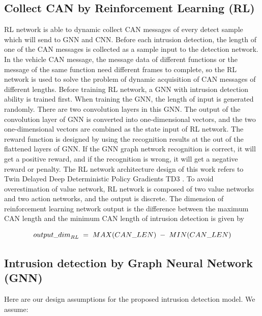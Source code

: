 \documentclass[lettersize,journal]{IEEEtran}
\begin{document}
\subsection{Collect CAN by Reinforcement Learning (RL)}\label{RL}
RL network is able to dynamic collect CAN messages of every detect sample which will send to GNN and CNN. Before each intrusion detection, the length of one of the CAN messages is collected as a sample input to the detection network. In the vehicle CAN message, the message data of different functions or the message of the same function need different frames to complete, so the RL network is used to solve the problem of dynamic acquisition of CAN messages of different lengths. Before training RL network, a GNN with intrusion detection ability is trained first. When training the GNN, the length of input is generated randomly. There are two convolution layers in this GNN. The output of the convolution layer of GNN is converted into one-dimensional vectors, and the two one-dimensional vectors are combined as the state input of RL network. The reward function is designed by using the recognition results at the out of the flattened layers of GNN. If the GNN graph network recognition is correct, it will get a positive reward, and if the recognition is wrong, it will get a negative reward or penalty. The RL network architecture design of this work refers to Twin Delayed Deep Deterministic Policy Gradients TD3 \cite{43}. To avoid overestimation of value network, RL network is composed of two value networks and two action networks, and the output is discrete. The dimension of reinforcement learning network output is the difference between the maximum CAN length and the minimum CAN length of intrusion detection is given by

\begin{equation}
\label{deqn_ex_1}
\footnotesize {{output\_dim}_{RL}\ =\ MAX(CAN\_LEN)\ -\ MIN(CAN\_LEN)}
\end{equation}

\subsection{Intrusion detection by Graph Neural Network (GNN)}\label{GNN}

Here are our design assumptions for the proposed intrusion detection model. We assume:
\end{document}
